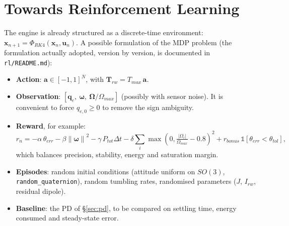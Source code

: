 \documentclass[11pt,a4paper]{article}
\newcommand{\vect}[1]{\bm{#1}}
\newcommand{\w}{\vect{\omega}}
\newcommand{\q}{\vect{q}}
\newcommand{\norm}[1]{\left\lVert #1 \right\rVert}
\newcommand{\code}[1]{\texttt{#1}}
\begin{document}
\section{Towards Reinforcement Learning}

The engine is already structured as a discrete-time environment:
$\vect x_{n+1} = \Phi_{RK4}(\vect x_n, \vect u_n)$. A possible formulation
of the MDP problem (the formulation actually adopted, version by version, is
documented in \code{rl/README.md}):
\begin{itemize}
  \item \textbf{Action}: $\vect a\in[-1,1]^N$, with $\vect T_{rw} = T_{max}\,\vect a$.
  \item \textbf{Observation}: $[\q_e,\ \w,\ \vect\Omega/\Omega_{max}]$
        (possibly with sensor noise). It is convenient to force $q_{e,0}\ge0$
        to remove the sign ambiguity.
  \item \textbf{Reward}, for example:
        \begin{equation}
          r_n = -\alpha\,\theta_{err} - \beta\norm{\w}^2 - \gamma\,P_{tot}\Delta t
                - \delta\sum_i \max\!\left(0, \tfrac{|\Omega_i|}{\Omega_{max}} - 0.8\right)^2
                + r_{bonus}\,\mathbb{1}[\theta_{err} < \theta_{tol}],
        \end{equation}
        which balances precision, stability, energy and saturation margin.
  \item \textbf{Episodes}: random initial conditions (attitude uniform on
        $SO(3)$, \code{random\_quaternion}), random tumbling rates,
        randomised parameters ($J$, $I_{rw}$, residual dipole).
  \item \textbf{Baseline}: the PD of \S\ref{sec:pd}, to be compared on settling
        time, energy consumed and steady-state error.
\end{itemize}

\end{document}
